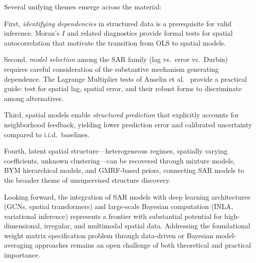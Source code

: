 \documentclass[conference]{IEEEtran}
\theoremstyle{definition}
\begin{document}
Several unifying themes emerge across the material:

First, \emph{identifying dependencies} in structured data is a prerequisite for valid inference. Moran's $I$ and related diagnostics provide formal tests for spatial autocorrelation that motivate the transition from OLS to spatial models.

Second, \emph{model selection} among the SAR family (lag vs.\ error vs.\ Durbin) requires careful consideration of the substantive mechanism generating dependence. The Lagrange Multiplier tests of Anselin et al.\ \cite{anselin1996simple} provide a practical guide: test for spatial lag, spatial error, and their robust forms to discriminate among alternatives.

Third, spatial models enable \emph{structured prediction} that explicitly accounts for neighborhood feedback, yielding lower prediction error and calibrated uncertainty compared to i.i.d.\ baselines.

Fourth, latent spatial structure---heterogeneous regimes, spatially varying coefficients, unknown clustering---can be recovered through mixture models, BYM hierarchical models, and GMRF-based priors, connecting SAR models to the broader theme of unsupervised structure discovery.

Looking forward, the integration of SAR models with deep learning architectures (GCNs, spatial transformers) and large-scale Bayesian computation (INLA, variational inference) represents a frontier with substantial potential for high-dimensional, irregular, and multimodal spatial data. Addressing the foundational weight matrix specification problem through data-driven or Bayesian model-averaging approaches remains an open challenge of both theoretical and practical importance.
\end{document}
